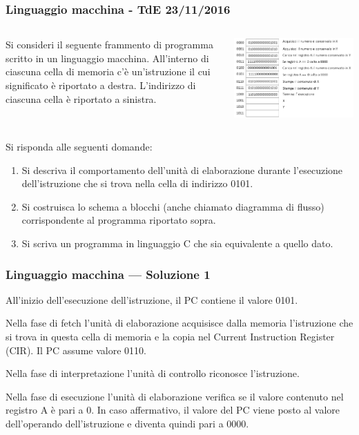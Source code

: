 \documentclass[aspectratio=169]{beamer}
\begin{document}
\begin{frame}[allowframebreaks]
\frametitle{Linguaggio macchina - TdE 23/11/2016}
\begin{columns}
    \begin{column}{0.5\textwidth}
        Si consideri il seguente frammento di programma scritto in un linguaggio macchina.
        All'interno di ciascuna cella di memoria c'è un'istruzione il cui significato è riportato a destra.
        L'indirizzo di ciascuna cella è riportato a sinistra.
    \end{column}
    \begin{column}{0.5\textwidth}
        \includegraphics[width=\textwidth]{./codice_macchina}
    \end{column}
\end{columns}

Si risponda alle seguenti domande:
\pause
\begin{enumerate}
\item Si descriva il comportamento dell'unità di elaborazione durante l'esecuzione dell'istruzione che si trova nella cella di indirizzo 0101.
\item Si costruisca lo schema a blocchi (anche chiamato diagramma di flusso) corrispondente al programma riportato sopra.
\item Si scriva un programma in linguaggio C che sia equivalente a quello dato.
\end{enumerate}
\end{frame}

\begin{frame}
\frametitle{Linguaggio macchina --- Soluzione 1}
All'inizio dell'esecuzione dell'istruzione, il PC contiene il valore 0101.

Nella fase di fetch l'unità di elaborazione acquisisce dalla memoria l'istruzione che si trova in questa cella di memoria e la copia nel Current Instruction Register (CIR). Il PC assume valore 0110.

Nella fase di interpretazione l'unità di controllo riconosce l'istruzione.

Nella fase di esecuzione l'unità di elaborazione verifica se il valore contenuto nel registro A è pari a 0. In caso affermativo, il valore del PC viene posto al valore dell'operando dell'istruzione e diventa quindi pari a 0000.
\end{frame}
\end{document}
